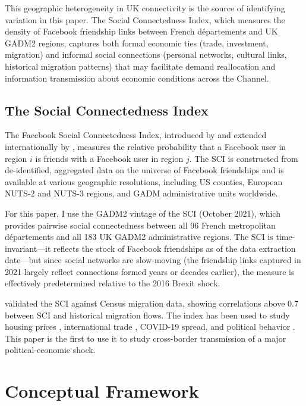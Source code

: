 \documentclass[12pt]{article}
\begin{document}
This geographic heterogeneity in UK connectivity is the source of identifying variation in this paper. The Social Connectedness Index, which measures the density of Facebook friendship links between French d\'epartements and UK GADM2 regions, captures both formal economic ties (trade, investment, migration) and informal social connections (personal networks, cultural links, historical migration patterns) that may facilitate demand reallocation and information transmission about economic conditions across the Channel.

\subsection{The Social Connectedness Index}

The Facebook Social Connectedness Index, introduced by \citet{bailey2018social} and extended internationally by \citet{bailey2021international}, measures the relative probability that a Facebook user in region $i$ is friends with a Facebook user in region $j$. The SCI is constructed from de-identified, aggregated data on the universe of Facebook friendships and is available at various geographic resolutions, including US counties, European NUTS-2 and NUTS-3 regions, and GADM administrative units worldwide.

For this paper, I use the GADM2 vintage of the SCI (October 2021), which provides pairwise social connectedness between all 96 French metropolitan d\'epartements and all 183 UK GADM2 administrative regions. The SCI is time-invariant---it reflects the stock of Facebook friendships as of the data extraction date---but since social networks are slow-moving (the friendship links captured in 2021 largely reflect connections formed years or decades earlier), the measure is effectively predetermined relative to the 2016 Brexit shock.

\citet{bailey2018social} validated the SCI against Census migration data, showing correlations above 0.7 between SCI and historical migration flows. The index has been used to study housing prices \citep{bailey2018house}, international trade \citep{bailey2021international}, COVID-19 spread, and political behavior \citep{mastrosavvas2024social}. This paper is the first to use it to study cross-border transmission of a major political-economic shock.


\section{Conceptual Framework}
\end{document}
